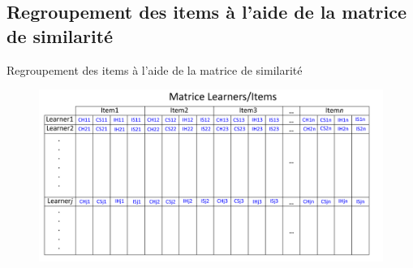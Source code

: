 \documentclass[aspectratio=169,professionalfonts, 12pt]{beamer}
\begin{document}


\subsection{Regroupement des items à l’aide de la matrice de similarité}

\begin{frame}
  \justifying 
  \begin{minipage}{\textwidth}
    \begin{center}
      \huge Regroupement des items à l’aide de la matrice de similarité
    \end{center}
  \end{minipage}
\end{frame}

\begin{frame}
  \justifying 
  \begin{minipage}{\textwidth}
    \begin{figure}[H]
      \begin{center}
        \includegraphics[scale=0.18]{images/contribution/matrice_learners-items.png}
      \end{center}
    \end{figure}
  \end{minipage}
\end{frame}
\end{document}

